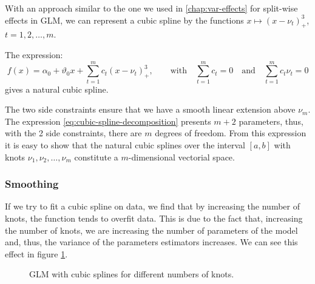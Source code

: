 \documentclass[a4paper, nobind]{templates/ociamthesis}
\theoremstyle{definition}
\theoremstyle{definition}
\theoremstyle{definition}
\theoremstyle{remark}
\begin{document}
With an approach similar to the one we used in \ref{chap:var-effects} for split-wise effects in GLM, we can represent a cubic spline by the functions \(x \mapsto \left( x-\nu_t \right)_+^3\), \(t=1,2,\dots,m\).

The expression:
\begin{equation}
\label{eq:cubic-spline-decomposition}
f(x) = \alpha_0 + \vartheta_0 x + \sum_{t=1}^{m}{c_t \left( x-\nu_t \right)_+^3}, \qquad \text{with} \quad \sum_{t=1}^{m}{c_t} = 0 \quad \text{and} \quad \sum_{t=1}^{m}{c_t\nu_t} = 0
\end{equation}
gives a natural cubic spline.

The two side constraints ensure that we have a smooth linear extension above \(\nu_m\). The expression \eqref{eq:cubic-spline-decomposition} presents \(m+2\) parameters, thus, with the 2 side constraints, there are \(m\) degrees of freedom. From this expression it is easy to show that the natural cubic splines over the interval \([a,b]\) with knots \(\nu_1, \nu_2, \dots, \nu_m\) constitute a \(m\)-dimensional vectorial space.

\hypertarget{smoothing}{%
\subsubsection{Smoothing}\label{smoothing}}

If we try to fit a cubic spline on data, we find that by increasing the number of knots, the function tends to overfit data. This is due to the fact that, increasing the number of knots, we are increasing the number of parameters of the model and, thus, the variance of the parameters estimators increases. We can see this effect in figure \ref{fig:cub-spline}.





\begin{figure}[!hbtp]

{\centering {}\newline{}

}

\caption{GLM with cubic splines for different numbers of knots.}\label{fig:cub-spline}
\end{figure}
\end{document}
